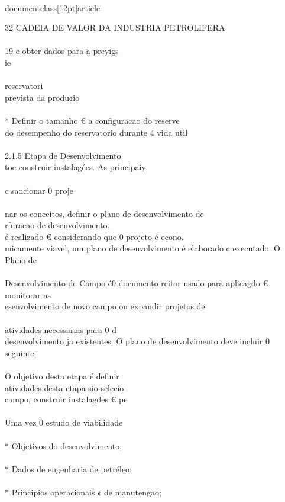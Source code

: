 \\documentclass[12pt]{article}
\begin{document}
32 CADEIA DE VALOR DA INDUSTRIA PETROLIFERA\\
\\
19 e obter dados para a preyigs\\
ie\\
\\
reservatori\\
prevista da produ¢io\\
\\
* Definir o tamanho € a configuracao do reserve\\
do desempenho do reservatorio durante 4 vida util\\
\\
2.1.5 Etapa de Desenvolvimento\\
toe construir instalagées. As principaiy\\
\\
¢ sancionar 0 proje\\
\\
nar os conceitos, definir o plano de desenvolvimento de\\
rfuracao de desenvolvimento.\\
é realizado € considerando que 0 projeto é econo.\\
micamente viavel, um plano de desenvolvimento é elaborado ¢ executado. O Plano de\\
\\
Desenvolvimento de Campo é0 documento reitor usado para aplicagdo € monitorar as\\
esenvolvimento de novo campo ou expandir projetos de\\
\\
atividades necessarias para 0 d\\
desenvolvimento ja existentes. O plano de desenvolvimento deve incluir 0 seguinte:\\
\\
O objetivo desta etapa é definir\\
atividades desta etapa sio selecio\\
campo, construir instalagdes € pe\\
\\
Uma vez 0 estudo de viabilidade\\
\\
* Objetivos do desenvolvimento;\\
\\
* Dados de engenharia de petréleo;\\
\\
* Principios operacionais ¢ de manutengao;\\
\end{document}
